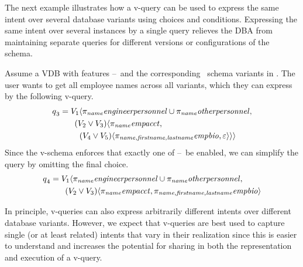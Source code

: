 
The next example illustrates how a v-query can be used to express the same
intent over several database variants using choices and conditions. Expressing
the same intent over several instances by a single query relieves the DBA from
maintaining separate queries for different versions or configurations of the
schema.

\begin{example}
\label{eg:vq-same-intent-mult-vars}
Assume a VDB with features \vOne--\vFive\ and the corresponding \basic\ schema
variants in . The user wants to get all employee names across all
variants, which they can express by the following v-query.
%
\begin{align*}
\vQ_3 &= 
  \vOne\chcL
    \pi_{\name}\engemp \cup \pi_{\name}\othemp, \\
 & \hspace{18pt}
    (\vTwo\vee\vThree)\chcL
      \pi_{\name}\empacct, \\
 & \hspace{24pt}
      \chc[(\vFour\vee\vFive)]{\pi_{\name,\fname,\lname}\empbio, \emp}\chcR\chcR
\end{align*}
%
Since the v-schema enforces that exactly one of \vOne--\vFive\ be enabled, we
can simplify the query by omitting the final choice.
%
\begin{align*}
\vQ_4 &= 
  \vOne\chcL
    \pi_{\name}\engemp \cup \pi_{\name}\othemp, \\
 & \hspace{18pt}
    \chc[(\vTwo\vee\vThree)]{
      \pi_{\name}\empacct,
      \pi_{\name,\fname,\lname}\empbio}
\end{align*}
%
\end{example}

In principle, v-queries can also express arbitrarily different intents over
different database variants. However, we expect that v-queries are best used to
capture single (or at least related) intents that vary in their realization
since this is easier to understand and increases the potential for sharing in
both the representation and execution of a v-query.



